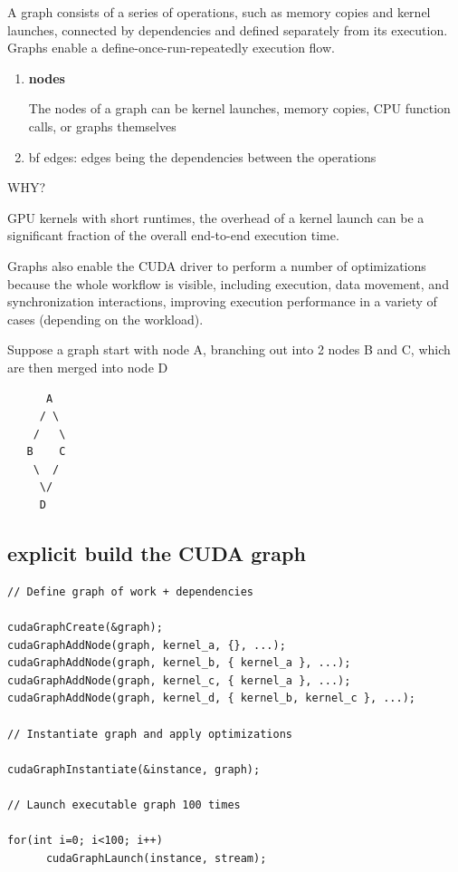 A graph consists of a series of operations, such as memory copies and kernel
launches, connected by dependencies and defined separately from its execution.
Graphs enable a define-once-run-repeatedly execution flow.

\begin{enumerate}
  \item {\bf nodes}
  
  The nodes of a graph can be kernel launches, memory copies, CPU function calls, or graphs themselves
  
  
  \item {bf edges}: edges being the dependencies between the operations
\end{enumerate}


\begin{mdframed}

WHY?

GPU kernels with short runtimes, the overhead of a kernel launch can be a
significant fraction of the overall end-to-end execution time.

Graphs also enable the CUDA driver to perform a number of optimizations because
the whole workflow is visible, including execution, data movement, and
synchronization interactions, improving execution performance in a variety of
cases (depending on the workload).


\end{mdframed}


Suppose a graph start with node A, branching out into 2 nodes B and C, which are then merged into node D
\begin{verbatim}
      A
     / \
    /   \
   B    C
    \  /
     \/
     D
\end{verbatim}


\subsection{explicit build the CUDA graph}

\begin{lstlisting}
// Define graph of work + dependencies

cudaGraphCreate(&graph);
cudaGraphAddNode(graph, kernel_a, {}, ...);
cudaGraphAddNode(graph, kernel_b, { kernel_a }, ...);
cudaGraphAddNode(graph, kernel_c, { kernel_a }, ...);
cudaGraphAddNode(graph, kernel_d, { kernel_b, kernel_c }, ...);

// Instantiate graph and apply optimizations

cudaGraphInstantiate(&instance, graph);

// Launch executable graph 100 times

for(int i=0; i<100; i++)
      cudaGraphLaunch(instance, stream);
\end{lstlisting}

